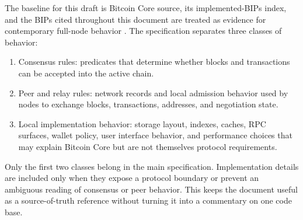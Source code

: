 The baseline for this draft is Bitcoin Core source, its
implemented-BIPs index, and the BIPs cited throughout this document are treated
as evidence for contemporary full-node behavior
\cite{bitcoin-core-v31}. The specification
separates three classes of behavior:

\begin{enumerate}[leftmargin=*]
  \item Consensus rules: predicates that determine whether blocks and
        transactions can be accepted into the active chain.
  \item Peer and relay rules: network records and local admission behavior used
        by nodes to exchange blocks, transactions, addresses, and negotiation
        state.
  \item Local implementation behavior: storage layout, indexes, caches, RPC
        surfaces, wallet policy, user interface behavior, and performance
        choices that may explain Bitcoin Core but are not themselves protocol
        requirements.
\end{enumerate}

Only the first two classes belong in the main specification. Implementation
details are included only when they expose a protocol boundary or prevent an
ambiguous reading of consensus or peer behavior. This keeps the document useful
as a source-of-truth reference without turning it into a commentary on one code
base.
